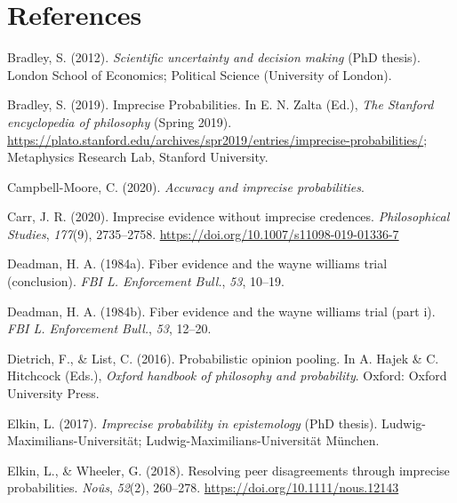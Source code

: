 \documentclass[
  10pt,
  dvipsnames,enabledeprecatedfontcommands]{scrartcl}
\newlength{\cslhangindent}
\newlength{\cslentryspacingunit} %
\newenvironment{CSLReferences}[2] %
 {%
  \setlength{\parindent}{0pt}
  \ifodd #1
  \let\oldpar\par
  \def\par{\hangindent=\cslhangindent\oldpar}
  \fi
  \setlength{\parskip}{#2\cslentryspacingunit}
 }%
 {}
\begin{document}
\hypertarget{references}{%
\section*{References}\label{references}}

\hypertarget{refs}{}
\begin{CSLReferences}{1}{0}
\leavevmode{}%
Bradley, S. (2012). \emph{Scientific uncertainty and decision making}
(PhD thesis). London School of Economics; Political Science (University
of London).

\leavevmode{}%
Bradley, S. (2019). {Imprecise Probabilities}. In E. N. Zalta (Ed.),
\emph{The {Stanford} encyclopedia of philosophy} ({S}pring 2019).
\url{https://plato.stanford.edu/archives/spr2019/entries/imprecise-probabilities/};
Metaphysics Research Lab, Stanford University.

\leavevmode{}%
Campbell-Moore, C. (2020). \emph{Accuracy and imprecise probabilities}.

\leavevmode{}%
Carr, J. R. (2020). Imprecise evidence without imprecise credences.
\emph{Philosophical Studies}, \emph{177}(9), 2735--2758.
\url{https://doi.org/10.1007/s11098-019-01336-7}

\leavevmode{}%
Deadman, H. A. (1984a). Fiber evidence and the wayne williams trial
(conclusion). \emph{FBI L. Enforcement Bull.}, \emph{53}, 10--19.

\leavevmode{}%
Deadman, H. A. (1984b). Fiber evidence and the wayne williams trial
(part i). \emph{FBI L. Enforcement Bull.}, \emph{53}, 12--20.

\leavevmode{}%
Dietrich, F., \& List, C. (2016). Probabilistic opinion pooling. In A.
Hajek \& C. Hitchcock (Eds.), \emph{Oxford handbook of philosophy and
probability}. Oxford: Oxford University Press.

\leavevmode{}%
Elkin, L. (2017). \emph{Imprecise probability in epistemology} (PhD
thesis). Ludwig-Maximilians-Universit{ä}t;
Ludwig-Maximilians-Universität München.

\leavevmode{}%
Elkin, L., \& Wheeler, G. (2018). Resolving peer disagreements through
imprecise probabilities. \emph{Noûs}, \emph{52}(2), 260--278.
\url{https://doi.org/10.1111/nous.12143}


\end{CSLReferences}
\end{document}
